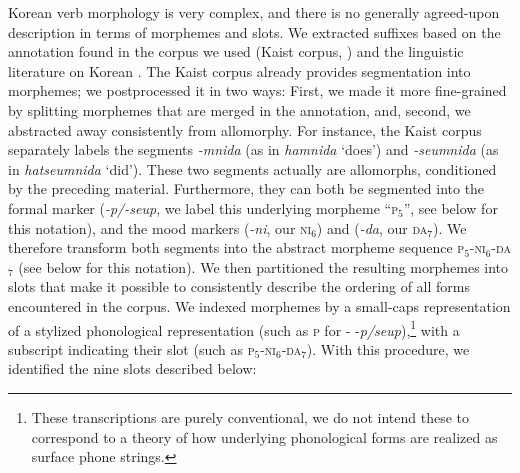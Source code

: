 Korean verb morphology is very complex, and there is no generally agreed-upon description in terms of morphemes and slots.
We extracted suffixes based on the annotation found in the corpus we used (Kaist corpus, \citet{chun2018building}) and the linguistic literature on Korean \citep{yeon2010korean}.
The Kaist corpus already provides segmentation into morphemes; we postprocessed it in two ways:
First, we made it more fine-grained by splitting morphemes that are merged in the annotation, and, second, we abstracted away consistently from allomorphy.
For instance, the Kaist corpus separately labels the segments  \textit{-mnida} (as in  \textit{hamnida} `does') and  \textit{-seumnida} (as in  \textit{hatseumnida} `did').
These two segments actually are allomorphs, conditioned by the preceding material.
Furthermore, they can both be segmented into the formal marker  (\textit{-p/-seup}, we label this underlying morpheme ``\textsc{p}$_5$'', see below for this notation), and the mood markers  (\textit{-ni}, our \textsc{ni}$_6$) and  (\textit{-da}, our \textsc{da}$_7$).
We therefore transform both segments into the abstract morpheme sequence \textsc{p}$_5$-\textsc{ni}$_6$-\textsc{da}$_7$ (see below for this notation).
We then partitioned the resulting morphemes into slots that make it possible to consistently describe the ordering of all forms encountered in the corpus.
We indexed morphemes by a small-caps representation of a stylized phonological representation (such as \textsc{p} for -  -\textit{p/seup}),\footnote{These transcriptions are purely conventional, we do not intend these to correspond to a theory of how underlying phonological forms are realized as surface phone strings.} with a subscript indicating their slot (such as \textsc{p}$_5$-\textsc{ni}$_6$-\textsc{da}$_7$).
With this procedure, we identified the nine slots described below:
